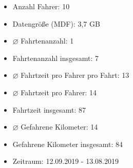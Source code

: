\begin{itemize}
  \item Anzahl Fahrer: 10
  \item Datengröße (MDF): 3,7 GB
  \item $\diameter$ Fahrtenanzahl: 1
  \item Fahrtenanzahl insgesamt: 7
  \item $\diameter$ Fahrtzeit pro Fahrer pro Fahrt: 13
  \item $\diameter$ Fahrtzeit pro Fahrer: 14
  \item Fahrtzeit insgesamt: 87
  \item $\diameter$ Gefahrene Kilometer: 14
  \item Gefahrene Kilometer insgesamt: 84
  \item Zeitraum: 12.09.2019 - 13.08.2019
\end{itemize}

